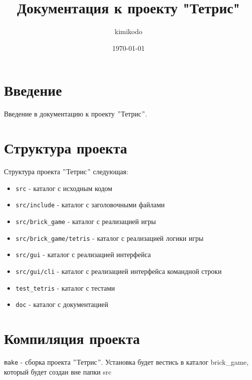 \documentclass[a4paper,12pt]{article}
\title{\textbf{Документация к проекту "Тетрис"}}
\author{kimikodo}
\date{\today}
\begin{document}
\maketitle

\section{Введение}
Введение в документацию к проекту \("\)Тетрис\("\).

\section{Структура проекта}
Структура проекта \("\)Тетрис\("\) следующая:
\begin{itemize}
\item \texttt{src} - каталог с исходным кодом
\item \texttt{src/include} - каталог с заголовочными файлами
\item \texttt{src/brick\_game} - каталог с реализацией игры
\item \texttt{src/brick\_game/tetris} - каталог с реализацией логики игры
\item \texttt{src/gui} - каталог с реализацией интерфейса
\item \texttt{src/gui/cli} - каталог с реализацией интерфейса командной строки
\item \texttt{test\_tetris} - каталог с тестами
\item \texttt{doc} - каталог с документацией
\end{itemize}

\section{Компиляция проекта}
\item \texttt{make} - сборка проекта \("\)Тетрис\("\).
Установка будет вестись в каталог brick\_game, который будет создан вне папки src
\end{document}

